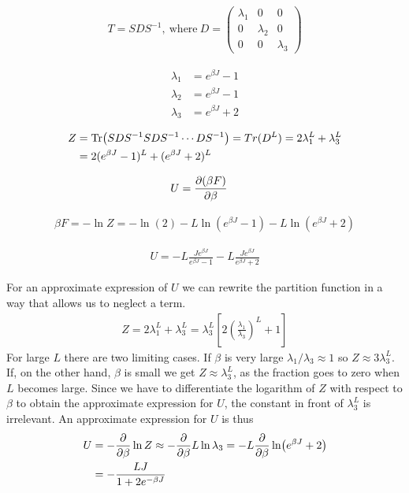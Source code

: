 \documentclass[reprint,english,notitlepage,aps,nobalancelastpage,nofootinbib]{revtex4-1}
\newcommand{\closed}[1]{\left(#1\right)}
\newcommand{\bracket}[1]{\left[#1\right]}
\newcommand{\ebj}{e^{\beta J}}
\renewcommand{\l}{\lambda}
\begin{document}
\begin{align*}
	T = SDS^{-1}, \:\mathrm{where}\: D = \begin{pmatrix}
		\lambda_1 & 0 & 0 \\ 
		0 & \lambda_2 & 0 \\
		0 & 0 & \lambda_3 
	\end{pmatrix}
\end{align*}

\begin{align*}
	\lambda_1 &= \ebj-1 \\ 
	\lambda_2 &= \ebj-1 \\ 
	\lambda_3 &= \ebj+2
\end{align*}

\begin{align*}
	Z &= \Tr(SDS^{-1}SDS^{-1}\cdots DS^{-1})=Tr(D^L)=2\lambda_1^L + \lambda_3^L \\ 
	&= 2(\ebj-1)^L + (\ebj+2)^L
\end{align*}

\begin{align*}
	U &= \pdv{(\beta F)}{\beta}
\end{align*}

\begin{align*}
	\beta F = -\ln Z = -\ln(2)-L\ln(\ebj-1)-L\ln(\ebj+2)
\end{align*}

\begin{align*}
	U = -L \frac{J\ebj}{\ebj-1} - L \frac{J\ebj}{\ebj+2}
\end{align*}

For an approximate expression of $U$ we can rewrite the partition function in a way that allows us to neglect a term. 
\begin{align*}
	Z = 2\l_1^L + \l_3^L = \l_3^L\bracket{2\closed{\frac{\l_1}{\l_3}}^L+1}
\end{align*} 
For large $L$ there are two limiting cases. If $\beta$ is very large $\l_1/\l_3\approx1$ so $Z\approx 3\l_3^L$. If, on the other hand, $\beta$ is small we get $Z\approx \l_3^L$, as the fraction goes to zero when $L$ becomes large. Since we have to differentiate the logarithm of $Z$ with respect to $\beta$ to obtain the approximate expression for $U$, the constant in front of $\l_3^L$ is irrelevant. An approximate expression for $U$ is thus 
\begin{align*}
	U&=-\pdv{\beta}\ln Z \approx -\pdv{\beta} L \ln \l_3 = -L \pdv{\beta}\ln (\ebj+2) \\ 
	&= -\frac{LJ}{1+2 e^{-\beta J}} 
\end{align*}
\end{document}
